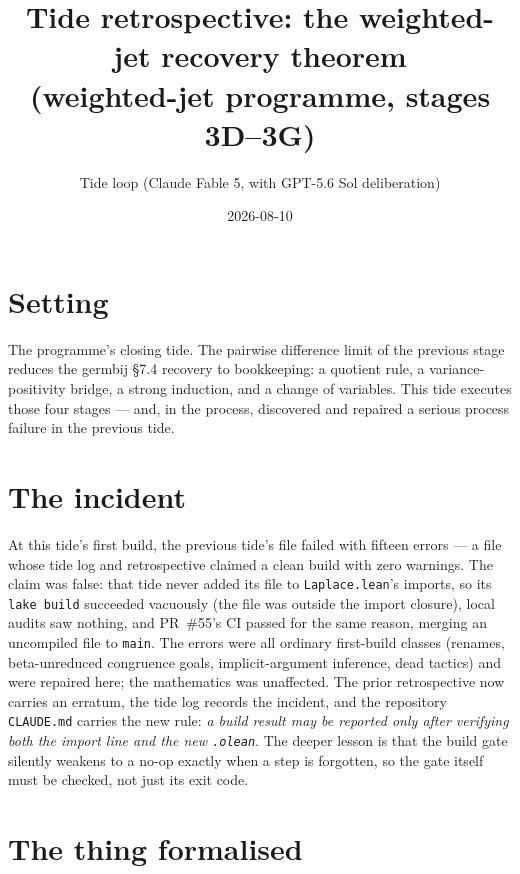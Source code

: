 \documentclass[11pt]{article}
\title{Tide retrospective: the weighted-jet recovery theorem\\
(weighted-jet programme, stages 3D--3G)}
\author{Tide loop (Claude Fable 5, with GPT-5.6 Sol deliberation)}
\date{2026-08-10}
\begin{document}
\maketitle

\section{Setting}

The programme's closing tide. The pairwise difference limit of the
previous stage reduces the germbij \S7.4 recovery to bookkeeping: a
quotient rule, a variance-positivity bridge, a strong induction, and
a change of variables. This tide executes those four stages ---
and, in the process, discovered and repaired a serious process
failure in the previous tide.

\section{The incident}

At this tide's first build, the previous tide's file failed with
fifteen errors --- a file whose tide log and retrospective claimed a
clean build with zero warnings. The claim was false: that tide never
added its file to \texttt{Laplace.lean}'s imports, so its
\texttt{lake build} succeeded vacuously (the file was outside the
import closure), local audits saw nothing, and PR~\#55's CI passed
for the same reason, merging an uncompiled file to \texttt{main}.
The errors were all ordinary first-build classes (renames,
beta-unreduced congruence goals, implicit-argument inference, dead
tactics) and were repaired here; the mathematics was unaffected. The
prior retrospective now carries an erratum, the tide log records the
incident, and the repository \texttt{CLAUDE.md} carries the new rule:
\emph{a build result may be reported only after verifying both the
import line and the new \texttt{.olean}}. The deeper lesson is that
the build gate silently weakens to a no-op exactly when a step is
forgotten, so the gate itself must be checked, not just its exit
code.

\section{The thing formalised}
\end{document}

